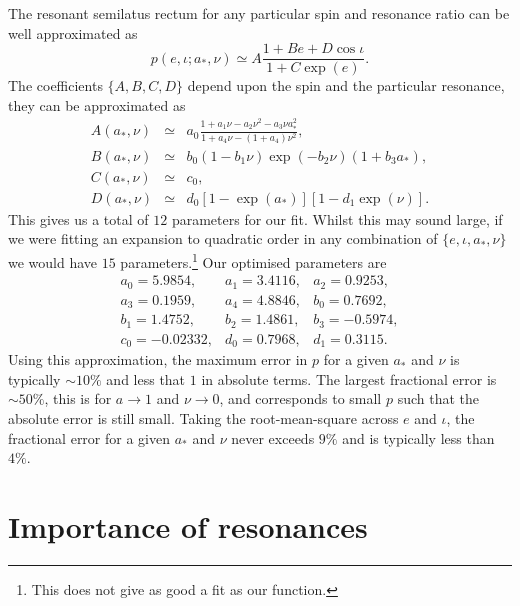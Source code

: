 \documentclass[aps,prd,amsfonts,amssymb,amsmath,nofootinbib,reprint,showpacs]{revtex4-1}
\begin{document}
The resonant semilatus rectum for any particular spin and resonance ratio can be well approximated as
\begin{equation}
p(e,\iota;a_\ast,\nu) \simeq A\frac{1 + B e + D \cos\iota}{1 + C\exp(e)}.
\end{equation}
The coefficients $\{A,B,C,D\}$ depend upon the spin and the particular resonance, they can be approximated as
\begin{eqnarray} 
A(a_\ast,\nu) & \simeq & a_0\frac{1 + a_1\nu - a_2 \nu^2 - a_3 \nu a_\ast^2}{1 + a_4\nu - (1 + a_4)\nu^2}, \\
B(a_\ast,\nu) & \simeq & b_0(1 - b_1\nu)\exp(-b_2\nu)(1 + b_3 a_\ast), \\
C(a_\ast,\nu) & \simeq & c_0, \\
D(a_\ast,\nu) & \simeq & d_0\left[1 - \exp(a_\ast)\right]\left[1 - d_1\exp(\nu)\right].
\end{eqnarray}
This gives us a total of $12$ parameters for our fit. Whilst this may sound large, if we were fitting an expansion to quadratic order in any combination of $\{e,\iota,a_\ast,\nu\}$ we would have $15$ parameters.\footnote{This does not give as good a fit as our function.} Our optimised parameters are
\begin{equation}
\begin{array}{lll}
a_0 = 5.9854, & a_1 = 3.4116, & a_2 = 0.9253,\\
a_3 = 0.1959, & a_4 = 4.8846, & b_0 = 0.7692,\\
b_1 = 1.4752, & b_2 = 1.4861, & b_3 = -0.5974,\\
c_0 = -0.02332, & d_0 = 0.7968, & d_1 = 0.3115.
\end{array}
\end{equation} 
Using this approximation, the maximum error in $p$ for a given $a_\ast$ and $\nu$ is typically $\sim10\%$ and less that $1$ in absolute terms. The largest fractional error is $\sim50\%$, this is for $a\rightarrow 1$ and $\nu \rightarrow 0$, and corresponds to small $p$ such that the absolute error is still small. Taking the root-mean-square across $e$ and $\iota$, the fractional error for a given $a_\ast$ and $\nu$ never exceeds $9\%$ and is typically less than $4\%$.

\section{Importance of resonances}
\end{document}
